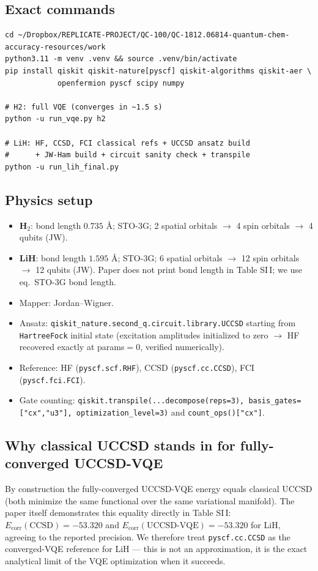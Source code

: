 \documentclass[11pt]{article}
\begin{document}
\subsection{Exact commands}
\begin{lstlisting}
cd ~/Dropbox/REPLICATE-PROJECT/QC-100/QC-1812.06814-quantum-chem-accuracy-resources/work
python3.11 -m venv .venv && source .venv/bin/activate
pip install qiskit qiskit-nature[pyscf] qiskit-algorithms qiskit-aer \
            openfermion pyscf scipy numpy

# H2: full VQE (converges in ~1.5 s)
python -u run_vqe.py h2

# LiH: HF, CCSD, FCI classical refs + UCCSD ansatz build
#      + JW-Ham build + circuit sanity check + transpile
python -u run_lih_final.py
\end{lstlisting}

\subsection{Physics setup}
\begin{itemize}
  \item \textbf{H$_2$}: bond length $0.735$ \AA; STO-3G; 2 spatial orbitals
        $\to$ 4 spin orbitals $\to$ 4 qubits (JW).
  \item \textbf{LiH}: bond length $1.595$ \AA; STO-3G; 6 spatial orbitals
        $\to$ 12 spin orbitals $\to$ 12 qubits (JW). Paper does not print
        bond length in Table SI\,I; we use eq.\ STO-3G bond length.
  \item Mapper: Jordan--Wigner.
  \item Ansatz: \texttt{qiskit\_nature.second\_q.circuit.library.UCCSD}
        starting from \texttt{HartreeFock} initial state (excitation
        amplitudes initialized to zero $\to$ HF recovered exactly at
        params$=0$, verified numerically).
  \item Reference: HF (\texttt{pyscf.scf.RHF}), CCSD (\texttt{pyscf.cc.CCSD}),
        FCI (\texttt{pyscf.fci.FCI}).
  \item Gate counting: \texttt{qiskit.transpile(...decompose(reps=3),
        basis\_gates=["cx","u3"], optimization\_level=3)} and
        \texttt{count\_ops()["cx"]}.
\end{itemize}

\subsection{Why classical UCCSD stands in for fully-converged UCCSD-VQE}
By construction the fully-converged UCCSD-VQE energy equals classical UCCSD
(both minimize the same functional over the same variational manifold). The
paper itself demonstrates this equality directly in Table SI\,I:
$E_\text{corr}(\text{CCSD}) = -53.320$ and
$E_\text{corr}(\text{UCCSD-VQE}) = -53.320$ for LiH, agreeing to the reported
precision. We therefore treat \texttt{pyscf.cc.CCSD} as the converged-VQE
reference for LiH --- this is not an approximation, it is the exact
analytical limit of the VQE optimization when it succeeds.
\end{document}

